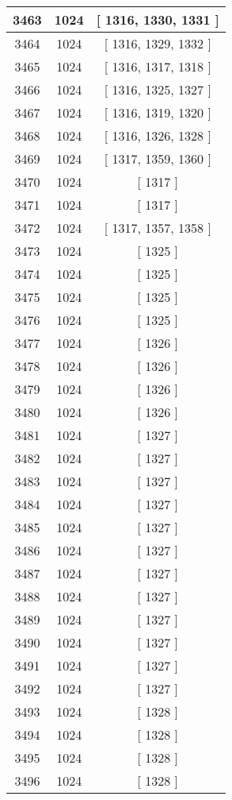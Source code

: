 \begin{center}
\begin{longtable}[H]{|| c c c ||}
\hline
3463 & 1024 & [ 1316, 1330, 1331 ] \\ 
\hline
3464 & 1024 & [ 1316, 1329, 1332 ] \\ 
\hline
3465 & 1024 & [ 1316, 1317, 1318 ] \\ 
\hline
3466 & 1024 & [ 1316, 1325, 1327 ] \\ 
\hline
3467 & 1024 & [ 1316, 1319, 1320 ] \\ 
\hline
3468 & 1024 & [ 1316, 1326, 1328 ] \\ 
\hline
3469 & 1024 & [ 1317, 1359, 1360 ] \\ 
\hline
3470 & 1024 & [ 1317 ] \\ 
\hline
3471 & 1024 & [ 1317 ] \\ 
\hline
3472 & 1024 & [ 1317, 1357, 1358 ] \\ 
\hline
3473 & 1024 & [ 1325 ] \\ 
\hline
3474 & 1024 & [ 1325 ] \\ 
\hline
3475 & 1024 & [ 1325 ] \\ 
\hline
3476 & 1024 & [ 1325 ] \\ 
\hline
3477 & 1024 & [ 1326 ] \\ 
\hline
3478 & 1024 & [ 1326 ] \\ 
\hline
3479 & 1024 & [ 1326 ] \\ 
\hline
3480 & 1024 & [ 1326 ] \\ 
\hline
3481 & 1024 & [ 1327 ] \\ 
\hline
3482 & 1024 & [ 1327 ] \\ 
\hline
3483 & 1024 & [ 1327 ] \\ 
\hline
3484 & 1024 & [ 1327 ] \\ 
\hline
3485 & 1024 & [ 1327 ] \\ 
\hline
3486 & 1024 & [ 1327 ] \\ 
\hline
3487 & 1024 & [ 1327 ] \\ 
\hline
3488 & 1024 & [ 1327 ] \\ 
\hline
3489 & 1024 & [ 1327 ] \\ 
\hline
3490 & 1024 & [ 1327 ] \\ 
\hline
3491 & 1024 & [ 1327 ] \\ 
\hline
3492 & 1024 & [ 1327 ] \\ 
\hline
3493 & 1024 & [ 1328 ] \\ 
\hline
3494 & 1024 & [ 1328 ] \\ 
\hline
3495 & 1024 & [ 1328 ] \\ 
\hline
3496 & 1024 & [ 1328 ] \\ 

\end{longtable}
\end{center}
